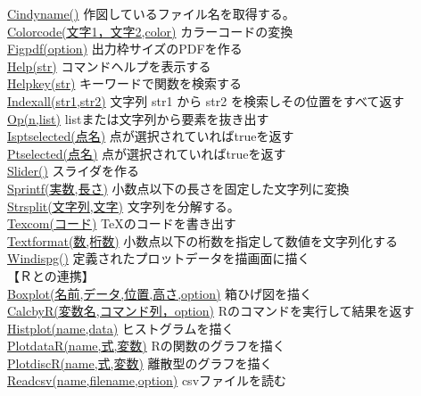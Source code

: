 \documentclass[papersize,a4paper,12pt,uplatex]{jsarticle}
\begin{document}
\begin{tabbing}
\hyperlink{cindyname}{Cindyname()}    \>作図しているファイル名を取得する。\\
\hyperlink{colorcode}{Colorcode(文字1，文字2,color)}  \>カラーコードの変換\\
\hyperlink{figpdf}{Figpdf(option)} \>出力枠サイズのPDFを作る\\
\hyperlink{help}{Help(str)}    \>コマンドヘルプを表示する\\
\hyperlink{helpkey}{Helpkey(str)}    \>キーワードで関数を検索する\\
\hyperlink{indexall}{Indexall(str1,str2)} \>文字列 str1 から str2 を検索しその位置をすべて返す\\
\hyperlink{op}{Op(n,list)}   \> listまたは文字列から要素を抜き出す\\
\hyperlink{isptselected}{Isptselected(点名)} \>点が選択されていればtrueを返す\\
\hyperlink{isptselected}{Ptselected(点名)} \>点が選択されていればtrueを返す\\
\hyperlink{slider}{Slider()}  \>スライダを作る\\
\hyperlink{sprintf}{Sprintf(実数,長さ)}  \>小数点以下の長さを固定した文字列に変換\\
\hyperlink{strsplit}{Strsplit(文字列,文字)}  \>文字列を分解する。\\
\hyperlink{texcom}{Texcom(コード)} \>\TeX のコードを書き出す\\
\hyperlink{textformat}{Textformat(数,桁数)}   \>小数点以下の桁数を指定して数値を文字列化する\\
\hyperlink{windispg}{Windispg()}  \>定義されたプロットデータを描画面に描く\\
\vspace{\baselineskip}
【Ｒとの連携】\\
\hyperlink{boxplot}{Boxplot(名前,データ,位置,高さ,option)} \>箱ひげ図を描く\\
\hyperlink{calcbyr}{CalcbyR(変数名,コマンド列，option)}  \>Rのコマンドを実行して結果を返す\\
\hyperlink{histplot}{Histplot(name,data)}  \>ヒストグラムを描く\\
\hyperlink{plotdatar}{PlotdataR(name,式,変数)}  \>Rの関数のグラフを描く\\
\hyperlink{plotdiscr}{PlotdiscR(name,式,変数)}  \>離散型のグラフを描く\\
\hyperlink{readcsv}{Readcsv(name,filename,option)}  \>csvファイルを読む\\

\end{tabbing}
\end{document}
